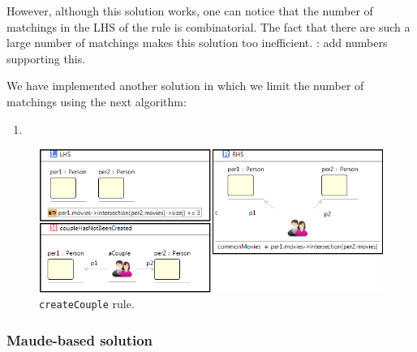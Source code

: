 \documentclass[draft]{llncs}
\newcommand{\todo}[1]{\textbf{\color{red}{TO-DO}}: #1}
\newcommand{\todo}[1]{}
\newcommand{\code}[1]{{\texttt{#1}}}
\begin{document}
However, although this solution works, one can notice that the number of matchings in the LHS of the rule is combinatorial. The fact that there are such a large number of matchings makes this solution too inefficient. \todo{add numbers supporting this.}

We have implemented another solution in which we limit the number of matchings using the next algorithm:
\begin{enumerate}
  \item 
\end{enumerate}

\begin{figure}[htp]
  \centering
  \includegraphics[width=\textwidth]{imgs/ruleCouples}
  \caption{\code{createCouple} rule.}\label{fig:createCouple}
\end{figure}

\subsubsection{Maude-based solution}



\providecommand{\url}[1]{\texttt{#1}}
\end{document}
